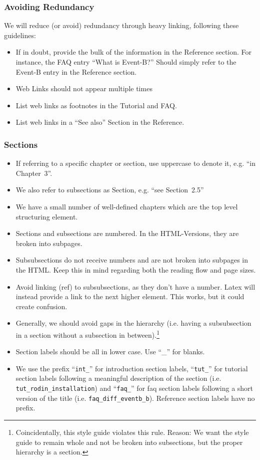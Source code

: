 \subsubsection{Avoiding Redundancy}

We will reduce (or avoid) redundancy through heavy linking, following these guidelines:

\begin{itemize}
	\item If in doubt, provide the bulk of the information in the Reference section.  For instance, the FAQ entry ``What is Event-B?''  Should simply refer to the Event-B entry in the Reference section.
	\item Web Links should not appear multiple times
	\item List web links as footnotes in the Tutorial and FAQ.
	\item List web links in a ``See also'' Section in the Reference.
\end{itemize}

\subsubsection{Sections}

\begin{itemize}
	\item If referring to a specific chapter or section, use uppercase to denote it, e.g. ``in Chapter~3''.
	\item We also refer to subsections as Section, e.g. ``see Section~2.5''
	\item We have a small number of well-defined chapters which are the top level structuring element.
	\item Sections and subsections are numbered.  In the HTML-Versions, they are broken into subpages.
    \item Subsubsections do not receive numbers and are not broken into subpages in the HTML.  Keep this in mind regarding both the reading flow and page sizes.
	\item Avoid linking (ref) to subsubsections, as they don't have a number.  Latex will instead provide a link to the next higher element.  This works, but it could create confusion.
	\item Generally, we should avoid gaps in the hierarchy (i.e. having a subsubsection in a section without a subsection in between).\footnote{Coincidentally, this style guide violates this rule. Reason: We want the style guide to remain whole and not be broken into subsections, but the proper hierarchy is a section.}
	\item Section labels should be all in lower case. Use ``\_'' for blanks.
	\item We use the prefix ``\texttt{int\_}'' for introduction section labels, ``\texttt{tut\_}'' for tutorial section labels following a meaningful description of the section (i.e. \texttt{tut\_rodin\_installation}) and ``\texttt{faq\_}'' for faq section labels following a short version of the title (i.e. \texttt{faq\_diff\_eventb\_b}). Reference section labels have no prefix.
\end{itemize}

